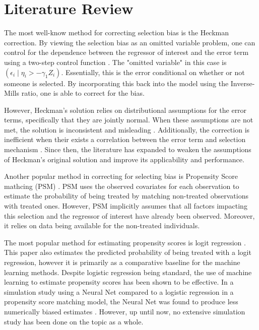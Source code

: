 \documentclass[12pt,english]{article}
\begin{document}
\section{Literature Review}

The most well-know method for correcting selection bias is the Heckman correction. By viewing the selection bias as an omitted variable problem, one can control for the dependence between the regressor of interest and the error term using a two-step control function \cite{heckman_1979}. The "omitted variable" in this case is $(\epsilon_i \mid \eta_i > -\gamma_1 Z_i)$. Essentially, this is the error conditional on whether or not someone is selected. By incorporating this back into the model using the Inverse-Mills ratio, one is able to correct for the bias.
\par
However, Heckman's solution relies on distributional assumptions for the error terms, specifically that they are jointly normal. When these assumptions are not met, the solution is inconsistent and misleading \cite{goldberger_1983}. Additionally, the correction is inefficient when their exists a correlation between the error term and selection mechanism \cite{puhani_2000}. Since then, the literature has expanded to weaken the assumptions of Heckman's original solution and improve its applicability and performance.
\par
Another popular method in correcting for selecting bias is Propensity Score mathcing (PSM) \cite{rosenbaum_rubin_1983}. PSM uses the observed covariates for each observation to estimate the probability of being treated by matching non-treated observations with treated ones. However, PSM implicitly assumes that all factors impacting this selection and the regressor of interest have already been observed. Moreover, it relies on data being available for the non-treated individuals.
\par
The most popular method for estimating propensity scores is logit regression \cite{austin_2011}. This paper also estimates the predicted probability of being treated with a logit regression, however it is primarily as a comparative baseline for the machine learning methods. Despite logistic regression being standard, the use of machine learning to estimate propensity scores has been shown to be effective. In a simulation study using a Neural Net compared to a logistic regression in a propensity score matching model, the Neural Net was found to produce less numerically biased estimates \cite{setoguchi_schneeweiss_brookhart_glynn_cook_2008}. However, up until now, no extensive simulation study has been done on the topic as a whole.
\end{document}
